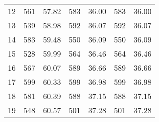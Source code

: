 \begin{longtable}{cp{2cm}p{2cm}p{2cm}p{2cm}p{2cm}p{2cm}}
12 &       561 &                       57.82 &          583 &                          36.00 &       583 &                       36.00 \\
13 &       539 &                       58.98 &          592 &                          36.07 &       592 &                       36.07 \\
14 &       583 &                       59.48 &          550 &                          36.09 &       550 &                       36.09 \\
15 &       528 &                       59.99 &          564 &                          36.46 &       564 &                       36.46 \\
16 &       567 &                       60.07 &          589 &                          36.66 &       589 &                       36.66 \\
17 &       599 &                       60.33 &          599 &                          36.98 &       599 &                       36.98 \\
18 &       581 &                       60.39 &          588 &                          37.15 &       588 &                       37.15 \\
19 &       548 &                       60.57 &          501 &                          37.28 &       501 &                       37.28 \\
\end{longtable}
